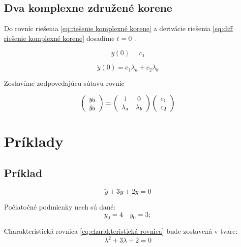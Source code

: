 \documentclass[a4paper,10pt]{article}
\begin{document}
\subsection{Dva komplexne združené korene}

Do rovníc riešenia \eqref{eq:riešenie komplexné korene} a derivácie riešenia \eqref{eq:diff riešenie komplexné korene} dosadíme $t=0$ .

\begin{equation}
	y(0)=c_1
\end{equation}
	
\begin{equation}
	\dot{y}(0)=c_1\lambda_a+c_2\lambda_b
\end{equation}

Zostavíme zodpovedajúcu sútavu rovníc

\begin{equation}
\label{eq:sústava pre komplexné korene}
	\left(\begin{array}{c}
		y_0\\
		\dot{y}_0\\
	\end{array}\right)=
	\left(\begin{array}{c c}
	 	1 & 0 \\
	 	\lambda_a & \lambda_b \\
	\end{array}\right)
	\left(\begin{array}{c}
		c_1\\
		c_2\\
	\end{array}\right)
\end{equation}

\pagebreak

\section{Príklady}

\subsection{Príklad}
\begin{equation*}
\ddot{y}+3\dot{y}+2y=0 
\end{equation*}

Počiatočné podmienky nech sú dané:
\begin{equation*}
	y_0=4\quad \dot{y}_0=3;
\end{equation*}

Charakteristická rovnica \eqref{eq:charakteristická rovnica} bude zostavená v tvare:
\begin{equation*}
\lambda^2+3\lambda+2=0
\end{equation*}
\end{document}
